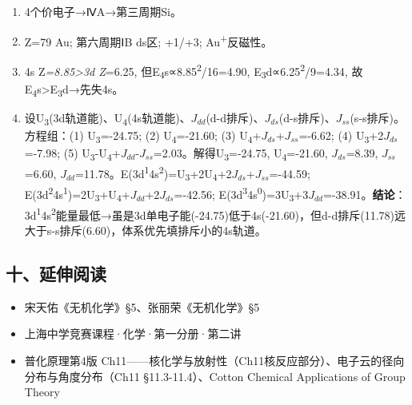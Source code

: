 \documentclass[a4paper,11pt]{ctexart}
\providecommand{\tightlist}{\setlength{\itemsep}{0pt}\setlength{\parskip}{0pt}}
\begin{document}
\begin{enumerate}
\def\labelenumi{\arabic{enumi}.}
\setcounter{enumi}{8}
\item
  4个价电子→ⅣA→第三周期Si。
\item
  Z=79 Au; 第六周期ⅠB ds区; +1/+3; Au\textsuperscript{+}反磁性。
\item
  4s Z\emph{=8.85\textgreater3d Z}=6.25, 但E\textsubscript{4}s∝8.85\textsuperscript{2}/16=4.90, E\textsubscript{3}d∝6.25\textsuperscript{2}/9=4.34, 故E\textsubscript{4}s\textgreater E\textsubscript{3}d→先失4s。
\item
  设U\textsubscript{3}(3d轨道能)、U\textsubscript{4}(4s轨道能)、\(J_{dd}\)(d-d排斥)、\(J_{ds}\)(d-s排斥)、\(J_{ss}\)(s-s排斥)。方程组：(1) U\textsubscript{3}=-24.75; (2) U\textsubscript{4}=-21.60; (3) U\textsubscript{4}+\(J_{ds}\)+\(J_{ss}\)=-6.62; (4) U\textsubscript{3}+2\(J_{ds}\)=-7.98; (5) U\textsubscript{3}-U\textsubscript{4}+\(J_{dd}\)-\(J_{ss}\)=2.03。解得U\textsubscript{3}=-24.75, U\textsubscript{4}=-21.60, \(J_{ds}\)=8.39, \(J_{ss}\)=6.60, \(J_{dd}\)=11.78。E(3d\textsuperscript{1}4s\textsuperscript{2})=U\textsubscript{3}+2U\textsubscript{4}+2\(J_{ds}\)+\(J_{ss}\)=-44.59; E(3d\textsuperscript{2}4s\textsuperscript{1})=2U\textsubscript{3}+U\textsubscript{4}+\(J_{dd}\)+2\(J_{ds}\)=-42.56; E(3d\textsuperscript{3}4s\textsuperscript{0})=3U\textsubscript{3}+3\(J_{dd}\)=-38.91。\textbf{结论}：3d\textsuperscript{1}4s\textsuperscript{2}能量最低→虽是3d单电子能(-24.75)低于4s(-21.60)，但d-d排斥(11.78)远大于s-s排斥(6.60)，体系优先填排斥小的4s轨道。
\end{enumerate}

\subsection{十、延伸阅读}\label{ux5341ux5ef6ux4f38ux9605ux8bfb}

\begin{itemize}
\tightlist
\item
  宋天佑《无机化学》§5、张丽荣《无机化学》§5
\item
  上海中学竞赛课程·化学·第一分册·第二讲
\item
  普化原理第4版 Ch11------核化学与放射性（Ch11核反应部分）、电子云的径向分布与角度分布（Ch11 §11.3-11.4）、Cotton Chemical Applications of Group Theory
\end{itemize}
\end{document}
